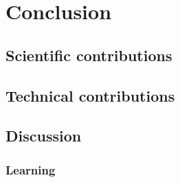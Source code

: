 \chapter{Conclusion}
\label{chapter|conclusion}

\section{Scientific contributions}
\label{sect|scientific-contributions}

\section{Technical contributions}
\label{sect|technical-contributions}

\section{Discussion}
\label{sect|discussion}

\subsection{Learning}
\label{sect|discussion-learning}

